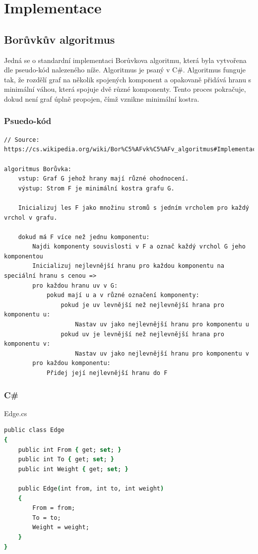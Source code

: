 \documentclass[11pt]{article}
\begin{document}
\pagebreak

\section{Implementace}

\subsection{Borůvkův algoritmus}
Jedná se o standardní implementaci Borůvkova algoritmu, která byla vytvořena dle pseudo-kód nalezeného níže. Algoritmus je psaný v C\#.
Algoritmus funguje tak, že rozdělí graf na několik 
spojených komponent a opakovaně přidává hranu s minimální váhou, která spojuje dvě různé komponenty. 
Tento proces pokračuje, dokud není graf úplně propojen, čímž vznikne minimální kostra.

\subsubsection{Psuedo-kód}
\begin{lstlisting}
// Source: https://cs.wikipedia.org/wiki/Bor%C5%AFvk%C5%AFv_algoritmus#Implementace_v_pseudok%C3%B3du

algoritmus Borůvka:
    vstup: Graf G jehož hrany mají různé ohodnocení.
    výstup: Strom F je minimální kostra grafu G.

    Inicializuj les F jako množinu stromů s jedním vrcholem pro každý vrchol v grafu.

    dokud má F více než jednu komponentu:
        Najdi komponenty souvislosti v F a označ každý vrchol G jeho komponentou
        Inicializuj nejlevnější hranu pro každou komponentu na speciální hranu s cenou =>
        pro každou hranu uv v G:
            pokud mají u a v různé označení komponenty:
                pokud je uv levnější než nejlevnější hrana pro komponentu u:
                    Nastav uv jako nejlevnější hranu pro komponentu u
                pokud uv je levnější než nejlevnější hrana pro komponentu v:
                    Nastav uv jako nejlevnější hranu pro komponentu v
        pro každou komponentu:
            Přidej její nejlevnější hranu do F
\end{lstlisting}

\subsubsection{C\#}

\medbreak\noindent
Edge.cs
\begin{lstlisting}[language=csh]
public class Edge
{
    public int From { get; set; }
    public int To { get; set; }
    public int Weight { get; set; }

    public Edge(int from, int to, int weight)
    {
        From = from;
        To = to;
        Weight = weight;
    }
}
\end{lstlisting}
\end{document}
